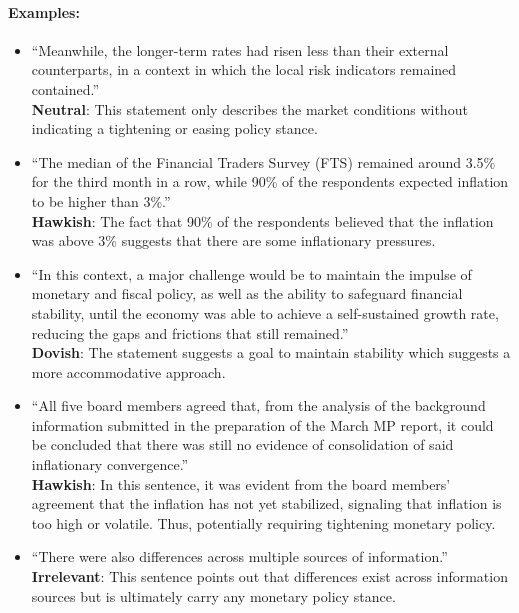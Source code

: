 \paragraph{Examples: }
\begin{itemize}
    \item ``Meanwhile, the longer-term rates had risen less than their external counterparts, in a context in which the local risk indicators remained contained.''\\
    \textbf{Neutral}: This statement only describes the market conditions without indicating a tightening or easing policy stance. 
    
    \item ``The median of the Financial Traders Survey (FTS) remained around 3.5\% for the third month in a row, while 90\% of the respondents expected inflation to be higher than 3\%.''\\
    \textbf{Hawkish}: The fact that 90\% of the respondents believed that the inflation was above 3\% suggests that there are some inflationary pressures.
    
    \item ``In this context, a major challenge would be to maintain the impulse of monetary and fiscal policy, as well as the ability to safeguard financial stability, until the economy was able to achieve a self-sustained growth rate, reducing the gaps and frictions that still remained.''\\
    \textbf{Dovish}: The statement suggests a goal to maintain stability which suggests a more accommodative approach.
    
    \item ``All five board members agreed that, from the analysis of the background information submitted in the preparation of the March MP report, it could be concluded that there was still no evidence of consolidation of said inflationary convergence.''\\
    \textbf{Hawkish}: In this sentence, it was evident from the board members' agreement that the inflation has not yet stabilized, signaling that inflation is too high or volatile. Thus, potentially requiring tightening monetary policy.
    
    \item ``There were also differences across multiple sources of information.''\\
    \textbf{Irrelevant}: This sentence points out that differences exist across information sources but is ultimately carry any monetary policy stance.
\end{itemize}


